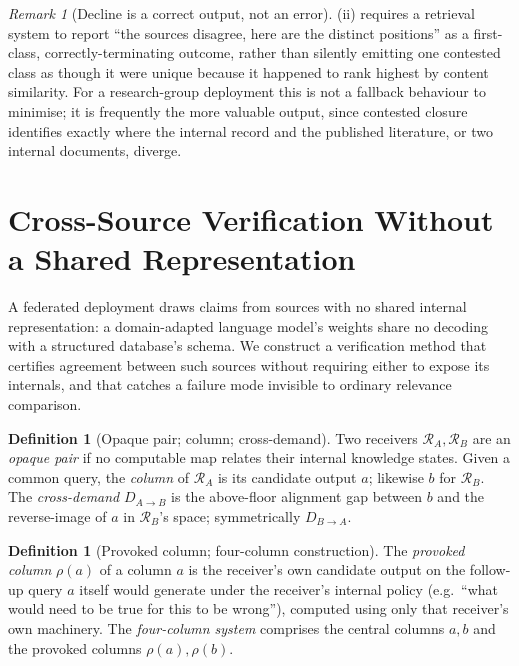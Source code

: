 \documentclass[11pt,twocolumn,a4paper]{article}
\theoremstyle{frathm}
\theoremstyle{definition}
\newtheorem{definition}[theorem]{Definition}
\theoremstyle{remark}
\newtheorem{remark}[theorem]{Remark}
\newcommand{\dem}{D}
\newcommand{\Rec}{\mathcal{R}}
\begin{document}
\begin{remark}[Decline is a correct output, not an error]
\label{rem:decline-honest}
(ii) requires a retrieval system to report ``the
sources disagree, here are the distinct positions'' as a first-class,
correctly-terminating outcome, rather than silently emitting one
contested class as though it were unique because it happened to rank
highest by content similarity. For a research-group deployment this is
not a fallback behaviour to minimise; it is frequently the more valuable
output, since contested closure identifies exactly where the internal
record and the published literature, or two internal documents, diverge.
\end{remark}

\section{Cross-Source Verification Without a Shared Representation}
\label{sec:relaxation}

A federated deployment draws claims from sources with no shared internal
representation: a domain-adapted language model's weights share no
decoding with a structured database's schema. We construct a
verification method that certifies agreement between such sources without
requiring either to expose its internals, and that catches a failure mode
invisible to ordinary relevance comparison.

\begin{definition}[Opaque pair; column; cross-demand]
\label{def:opaque}
Two receivers $\Rec_A,\Rec_B$ are an \emph{opaque pair} if no computable
map relates their internal knowledge states. Given a common query, the
\emph{column} of $\Rec_A$ is its candidate output $a$; likewise $b$ for
$\Rec_B$. The \emph{cross-demand} $\dem_{A\to B}$ is the above-floor
alignment gap between $b$ and the reverse-image of $a$ in $\Rec_B$'s
space; symmetrically $\dem_{B\to A}$.
\end{definition}

\begin{definition}[Provoked column; four-column construction]
\label{def:provoked}
The \emph{provoked column} $\rho(a)$ of a column $a$ is the receiver's own
candidate output on the follow-up query $a$ itself would generate under
the receiver's internal policy (e.g.\ ``what would need to be true for
this to be wrong''), computed using only that receiver's own machinery.
The \emph{four-column system} comprises the central columns $a,b$ and the
provoked columns $\rho(a),\rho(b)$.
\end{definition}
\end{document}
